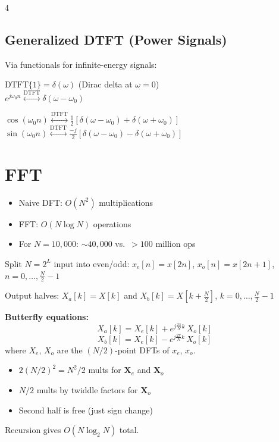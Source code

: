 \documentclass[8pt,a4paper,landscape]{extarticle}
\begin{document}
\begin{multicols*}{4}
\subsection{Generalized DTFT (Power Signals)}
Via functionals for infinite-energy signals:
\begin{prop}[title=Constant \& complex exponential]
$\mathrm{DTFT}\{1\}=\delta(\omega)$ \quad (Dirac delta at $\omega=0$)\\
$e^{j\omega_0 n}\overset{\mathrm{DTFT}}{\longleftrightarrow}\delta(\omega-\omega_0)$
\end{prop}
\begin{prop}[title=Sinusoids]
$\cos(\omega_0 n)\overset{\mathrm{DTFT}}{\longleftrightarrow}\tfrac{1}{2}[\delta(\omega-\omega_0)+\delta(\omega+\omega_0)]$\\
$\sin(\omega_0 n)\overset{\mathrm{DTFT}}{\longleftrightarrow}\tfrac{-j}{2}[\delta(\omega-\omega_0)-\delta(\omega+\omega_0)]$
\end{prop}


\section{FFT}

\begin{prop}[title=Complexity comparison]
\begin{itemize}
  \item Naive DFT: $O(N^2)$ multiplications
  \item FFT: $O(N\log N)$ operations
  \item For $N=10{,}000$: $\sim\!40{,}000$ vs.\ $>100$ million ops
\end{itemize}
\end{prop}

\begin{defn}[title=Decimation in time (Cooley-Tukey)]
Split $N=2^L$ input into even/odd:
$x_e[n]=x[2n]$, $x_o[n]=x[2n+1]$, $n=0,\ldots,\tfrac{N}{2}-1$

Output halves:
$X_a[k]=X[k]$ and $X_b[k]=X[k+\tfrac{N}{2}]$, $k=0,\ldots,\tfrac{N}{2}-1$

\textbf{Butterfly equations:}
\[
  X_a[k] = X_e[k] + e^{j\frac{2\pi}{N}k}\,X_o[k]
\]
\[
  X_b[k] = X_e[k] - e^{j\frac{2\pi}{N}k}\,X_o[k]
\]
where $X_e$, $X_o$ are the $(N/2)$-point DFTs of $x_e$, $x_o$.
\end{defn}

\begin{warn}[title=Cost breakdown]
\begin{itemize}
  \item $2(N/2)^2 = N^2/2$ mults for $\mathbf{X}_e$ and $\mathbf{X}_o$
  \item $N/2$ mults by twiddle factors for $\mathbf{X}_o$
  \item Second half is free (just sign change)
\end{itemize}
Recursion gives $O(N\log_2 N)$ total.
\end{warn}


\end{multicols*}
\end{document}

